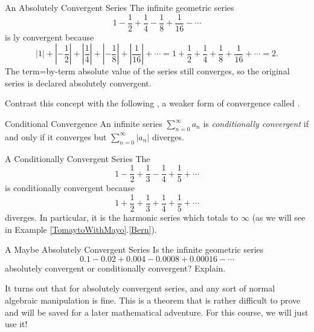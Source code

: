 \begin{example}{An Absolutely Convergent Series}
The infinite geometric series $$1-\frac{1}{2}+\frac{1}{4}-\frac{1}{8}+\frac{1}{16}-\cdots $$ is ly convergent because $$|1|+\left|-\frac{1}{2}\right|+\left|\frac{1}{4}\right|+\left|-\frac{1}{8}\right|+\left|\frac{1}{16}\right|+\cdots=1+\frac{1}{2}+\frac{1}{4}+\frac{1}{8}+\frac{1}{16}+\cdots=2.  $$ The term=by-term absolute value of the series still converges, so the original series is declared absolutely convergent.
\end{example}

Contrast this concept with the following , a weaker form of convergence called .

\begin{definition}{Conditional Convergence }
An infinite series $\sum_{n=0}^\infty a_n$ is \emph{conditionally convergent} if and only if it converges but $\sum_{n=0}^\infty \left| a_n \right|$ diverges.
\end{definition}

\begin{example}{A Conditionally Convergent Series}
The  $$1-\frac{1}{2}+\frac{1}{3}-\frac{1}{4}+\frac{1}{5}+\cdots $$ is conditionally convergent because $$1+\frac{1}{2}+\frac{1}{3}+\frac{1}{4}+\frac{1}{5}+\cdots $$ diverges. In particular, it is the harmonic series which totals to $\infty$ (as we will see in Example \ref{TomaytoWithMayo}.\ref{Bern}).  
\end{example}

\begin{exercise}{A Maybe Absolutely Convergent Series \Coffeecup \Coffeecup}
Is the infinite geometric series $$0.1-0.02+0.004-0.0008+0.00016-\cdots $$ absolutely convergent or conditionally convergent?  Explain.
\vspace*{.5in}
\end{exercise}

It turns out that for absolutely convergent series,  and any sort of normal algebraic manipulation is fine.  This is a theorem that is rather difficult to prove and will be saved for a later mathematical adventure.  For this course, we will just use it!
